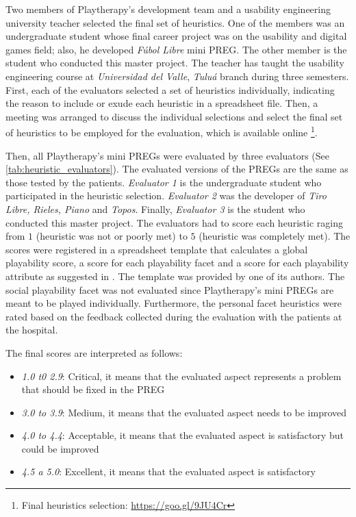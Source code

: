 Two members of Playtherapy's development team and a usability engineering university teacher selected the final set of heuristics. One of the members was an undergraduate student whose final career project was on the usability and digital games field; also, he developed \textit{F\'ubol Libre} mini \ac{PREG}. The other member is the student who conducted this master project. The teacher has taught the usability engineering course at \textit{Universidad del Valle}, \textit{Tulu\'a} branch during three semesters. First, each of the evaluators selected a set of heuristics individually, indicating the reason to include or exude each heuristic in a spreadsheet file. Then, a meeting was arranged to discuss the individual selections and select the final set of heuristics to be employed for the evaluation, which is available online \footnote{Final heuristics selection: \url{https://goo.gl/9JU4Cr}}.

Then, all Playtherapy's mini \acp{PREG} were evaluated by three evaluators (See \autoref{tab:heuristic_evaluators}). The evaluated versions of the \acp{PREG} are the same as those tested by the patients. \textit{Evaluator 1} is the undergraduate student who participated in the heuristic selection. \textit{Evaluator 2} was the developer of \textit{Tiro Libre, Rieles, Piano} and \textit{Topos}. Finally, \textit{Evaluator 3} is the student who conducted this master project. The evaluators had to score each heuristic raging from $1$ (heuristic was not or poorly met) to $5$ (heuristic was completely met). The scores were registered in a spreadsheet template that calculates a global playability score, a score for each playability facet and a score for each playability attribute as suggested in \autocite{Sanchez2012}. The template was provided by one of its authors. The social playability facet was not evaluated since Playtherapy's mini \acp{PREG} are meant to be played individually. Furthermore, the personal facet heuristics were rated based on the feedback collected during the evaluation with the patients at the hospital. 

The final scores are interpreted as follows:

\begin{itemize}
    \item \emph{1.0 t0 2.9}: Critical, it means that the evaluated aspect represents a problem that should be fixed in the \ac{PREG}
    \item \emph{3.0 to 3.9}: Medium, it means that the evaluated aspect needs to be improved 
    \item \emph{4.0 to 4.4}: Acceptable, it means that the evaluated aspect is satisfactory but could be improved
    \item \emph{4.5 a 5.0}: Excellent, it means that the evaluated aspect is satisfactory
\end{itemize}

